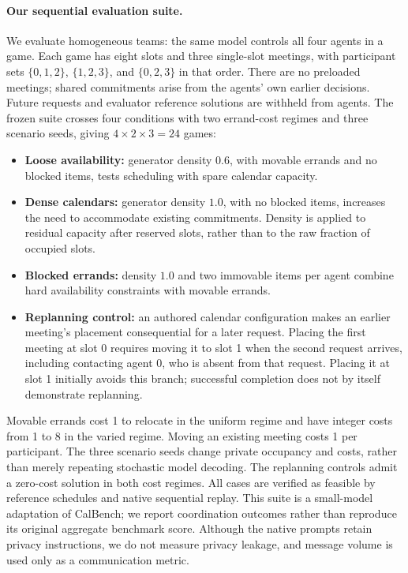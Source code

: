 \paragraph{Our sequential evaluation suite.}
We evaluate homogeneous teams: the same model controls all four agents in a
game. Each game has eight slots and three single-slot meetings, with
participant sets $\{0,1,2\}$, $\{1,2,3\}$, and $\{0,2,3\}$ in that order.
There are no preloaded meetings; shared commitments arise from the agents'
own earlier decisions. Future requests and evaluator reference solutions
are withheld from agents. The frozen suite crosses four conditions with two
errand-cost regimes and three scenario seeds, giving $4\times2\times3=24$
games:
\begin{itemize}
\item \textbf{Loose availability:} generator density $0.6$, with movable
errands and no blocked items, tests scheduling with spare calendar capacity.
\item \textbf{Dense calendars:} generator density $1.0$, with no blocked
items, increases the need to accommodate existing commitments. Density is
applied to residual capacity after reserved slots, rather than to the raw
fraction of occupied slots.
\item \textbf{Blocked errands:} density $1.0$ and two immovable items per
agent combine hard availability constraints with movable errands.
\item \textbf{Replanning control:} an authored calendar configuration makes
an earlier meeting's placement consequential for a later request. Placing
the first meeting at slot 0 requires moving it to slot 1 when the second
request arrives, including contacting agent 0, who is absent from that
request. Placing it at slot 1 initially avoids this branch; successful
completion does not by itself demonstrate replanning.
\end{itemize}
Movable errands cost 1 to relocate in the uniform regime and have integer
costs from 1 to 8 in the varied regime. Moving an existing meeting costs 1
per participant. The three scenario seeds change private occupancy and
costs, rather than merely repeating stochastic model decoding. The
replanning controls admit a zero-cost solution in both cost regimes.
All cases are verified as feasible by reference schedules and native
sequential replay. This suite is a small-model adaptation of CalBench; we
report coordination outcomes rather than reproduce its original aggregate
benchmark score. Although the native prompts retain privacy instructions,
we do not measure privacy leakage, and message volume is used only as a
communication metric.

